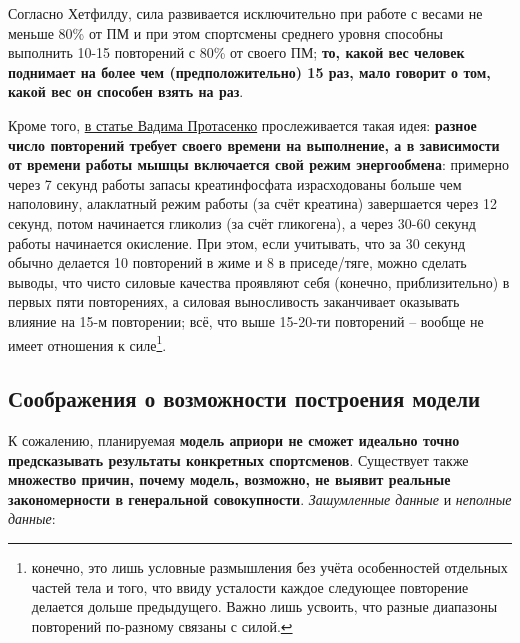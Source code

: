 \documentclass[
]{article}
\begin{document}
Согласно Хетфилду, сила развивается исключительно при работе с весами не
меньше 80\% от ПМ и при этом спортсмены среднего уровня способны
выполнить 10-15 повторений с 80\% от своего ПМ; \textbf{то, какой вес
человек поднимает на более чем (предположительно) 15 раз, мало говорит о
том, какой вес он способен взять на раз}.

Кроме того,
\href{https://github.com/PasaOpasen/Powerlifting-training-diary-and-articles/blob/master/Материалы\%20по\%20пауэрлифтингу\%20и\%20не\%20только/Тренинг/Вадим\%20Протасенко.\%20Супертренинг\%20без\%20заблуждений.pdf}{в
статье Вадима Протасенко} прослеживается такая идея: \textbf{разное
число повторений требует своего времени на выполнение, а в зависимости
от времени работы мышцы включается свой режим энергообмена}: примерно
через 7 секунд работы запасы креатинфосфата израсходованы больше чем
наполовину, алаклатный режим работы (за счёт креатина) завершается через
12 секунд, потом начинается гликолиз (за счёт гликогена), а через 30-60
секунд работы начинается окисление. При этом, если учитывать, что за 30
секунд обычно делается 10 повторений в жиме и 8 в приседе/тяге, можно
сделать выводы, что чисто силовые качества проявляют себя (конечно,
приблизительно) в первых пяти повторениях, а силовая выносливость
заканчивает оказывать влияние на 15-м повторении; всё, что выше 15-20-ти
повторений -- вообще не имеет отношения к силе\footnote{конечно, это
  лишь условные размышления без учёта особенностей отдельных частей тела
  и того, что ввиду усталости каждое следующее повторение делается
  дольше предыдущего. Важно лишь усвоить, что разные диапазоны
  повторений по-разному связаны с силой.}.

\hypertarget{ux441ux43eux43eux431ux440ux430ux436ux435ux43dux438ux44f-ux43e-ux432ux43eux437ux43cux43eux436ux43dux43eux441ux442ux438-ux43fux43eux441ux442ux440ux43eux435ux43dux438ux44f-ux43cux43eux434ux435ux43bux438}{%
\subsection{Соображения о возможности построения
модели}\label{ux441ux43eux43eux431ux440ux430ux436ux435ux43dux438ux44f-ux43e-ux432ux43eux437ux43cux43eux436ux43dux43eux441ux442ux438-ux43fux43eux441ux442ux440ux43eux435ux43dux438ux44f-ux43cux43eux434ux435ux43bux438}}

К сожалению, планируемая \textbf{модель априори не сможет идеально точно
предсказывать результаты конкретных спортсменов}. Существует также
\textbf{множество причин, почему модель, возможно, не выявит реальные
закономерности в генеральной совокупности}. \emph{Зашумленные данные} и
\emph{неполные данные}:
\end{document}
